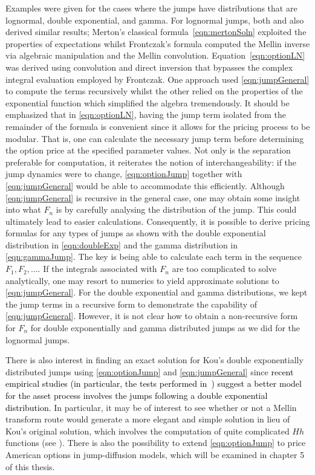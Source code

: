 Examples were given for the cases where the jumps have distributions that are lognormal, double exponential, and gamma. For lognormal jumps, both \cite{Merton1976} and \cite{Frontczak2013} also derived similar results; Merton's classical formula~\eqref{eqn:mertonSoln} exploited the properties of expectations whilst Frontczak's formula computed the Mellin inverse via algebraic manipulation and the Mellin convolution. Equation~\eqref{eqn:optionLN} was derived using convolution and direct inversion that bypasses the complex integral evaluation employed by Frontczak. One approach used \eqref{eqn:jumpGeneral} to compute the terms recursively whilst the other relied on the properties of the exponential function which simplified the algebra tremendously. It should be emphasized that in \eqref{eqn:optionLN}, having the jump term isolated from the remainder of the formula is convenient since it allows for the pricing process to be modular. That is, one can calculate the necessary jump term before determining the option price at the specified parameter values. Not only is the separation preferable for computation, it reiterates the notion of interchangeability: if the jump dynamics were to change, \eqref{eqn:optionJump} together with \eqref{eqn:jumpGeneral} would be able to accommodate this efficiently. %
Although \eqref{eqn:jumpGeneral} is recursive in the general case, one may obtain some insight into what $F_n$ is by carefully analysing the distribution of the jump. This could ultimately lead to easier calculations. Consequently, it is possible to derive pricing formulas for any types of jumps as shown with the double exponential distribution in \eqref{eqn:doubleExp} and the gamma distribution in \eqref{eqn:gammaJump}. The key is being able to calculate each term in the sequence $F_1, F_2, \ldots$. If the integrals associated with $F_n$ are too complicated to solve analytically, one may resort to numerics to yield approximate solutions to \eqref{eqn:jumpGeneral}. For the double exponential and gamma distributions, we kept the jump terms in a recursive form to demonstrate the capability of \eqref{eqn:jumpGeneral}. However, it is not clear how to obtain a non-recursive form for $F_n$ for double exponentially and gamma distributed jumps as we did for the lognormal jumps.

There is also interest in finding an exact solution for Kou's double exponentially distributed jumps \cite{Kou2002, Kou2004} using \eqref{eqn:optionJump} and \eqref{eqn:jumpGeneral} since \textcolor{black}{recent empirical studies (in particular, the tests performed in~\cite{Ramezani1998}) suggest a better model for the asset process involves the jumps following a double exponential distribution.} In particular, it may be of interest to see whether or not a Mellin transform route would generate a more elegant and simple solution in lieu of Kou's original solution, which involves the computation of quite complicated $Hh$ functions (see \cite[pp. 691]{Abramowitz1972}). There is also the possibility to extend \eqref{eqn:optionJump} to price American options in jump-diffusion models, which will be examined in chapter 5 of this thesis.
	
